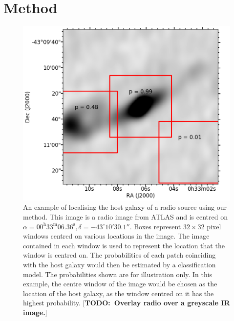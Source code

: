 \documentclass[fleqn,usenatbib,usedcolumn]{mnras}
\newcommand{\todo}[1]{ {\color{red}[{\bf TODO:~{#1}}]} }
\begin{document}
  \section{Method}\label{sec:method}
    \begin{figure}
      \centering
      \includegraphics[width=\columnwidth]{images/fig2-jkb.png}
      \caption{An example of localising the host galaxy of a radio source using
        our method. This image is a radio image from ATLAS and is centred on
        $\alpha = 00^\text{h}33^\text{m}06.36^\text{s}, \delta =
        -43^\circ{}10'30.1''$. Boxes represent $32 \times 32$ pixel windows
        centred on various locations in the image. The image contained in each
        window is used to represent the location that the window is centred
        on. The probabilities of each patch coinciding with the host galaxy
        would then be estimated by a classification model. The probabilities
        shown are for illustration only. In this example, the centre window of
        the image would be chosen as the location of the host galaxy, as the
        window centred on it has the highest probability. \todo{Overlay radio over a greyscale IR image.}}
      \label{fig:windows}
    \end{figure}
\end{document}
